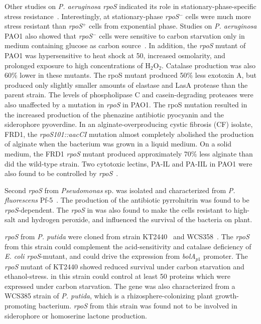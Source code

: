 Other studies on \emph{P. aeruginosa rpoS} indicated its role in
stationary-phase-specific stress resistance~\citep{Jorgensen1999}.
Interestingly, at stationary-phase \emph{rpoS}$^{-}$ cells were
much more stress resistant than \emph{rpoS}$^{+}$ cells from
exponential phase. Studies on \emph{P. aeruginosa} PAO1 also
showed that \emph{rpoS}$^{-}$ cells were sensitive to carbon
starvation only in medium containing glucose as carbon
source~\citep{Suh1999}. In addition, the \emph{rpoS} mutant of
PAO1 was hypersensitive to heat shock at 50\dg, increased
osmolarity, and prolonged exposure to high concentrations of
H$_{2}$O$_{2}$. Catalase production was also 60\% lower in these
mutants. The rpoS mutant produced 50\% less exotoxin A, but
produced only slightly smaller amounts of elastase and LasA
protease than the parent strain. The levels of phospholipase C and
casein-degrading proteases were also unaffected by a mutation in
\emph{rpoS} in PAO1. The rpoS mutation resulted in the increased
production of the phenazine antibiotic pyocyanin and the
siderophore pyoverdine. In an alginate-overproducing cystic
fibrosis (CF) isolate, FRD1, the \emph{rpoS101::aacCI} mutation
almost completely abolished the production of alginate when the
bacterium was grown in a liquid medium. On a solid medium, the
FRD1 \emph{rpoS} mutant produced approximately 70\% less alginate
than did the wild-type strain. Two cytotoxic lectins, PA-IL and
PA-IIL in PAO1 were also found to be controlled by
\emph{rpoS}~\citep{Winzer2000}.

Second \emph{rpoS} from \emph{Pseudomonas} sp. was isolated and
characterized from \emph{P. fluorescens}
\mbox{Pf-5}~\citep{Sarniguet1995}. The production of the
antibiotic pyrrolnitrin was found to be \emph{rpoS}-dependent. The
\emph{rpoS} in  was also found to make the cells
resistant to high-salt and hydrogen peroxide, and influenced the
survival of the bacteria on plant.


\emph{rpoS} from \emph{P. putida} were cloned from strain
KT2440~\citep{Ramos1998} and WCS358~\citep{Kojic1999}. The
\emph{rpoS} from this strain could complement the acid-sensitivity
and catalase deficiency of \emph{E. coli rpoS}-mutant, and could
drive the expression from \emph{bolA$_{p1}$} promoter. The
\emph{rpoS} mutant of KT2440 showed reduced survival under carbon
starvation and ethanol-stress.  in this strain could
control at least 50 proteins which were expressed under carbon
starvation. The  gene was also characterized from a WCS385
strain of \emph{P. putida}, which is a rhizosphere-colonizing
plant growth-promoting bacterium. \emph{rpoS} from this strain was
found not to be involved in siderophore or homoserine lactone
production.


